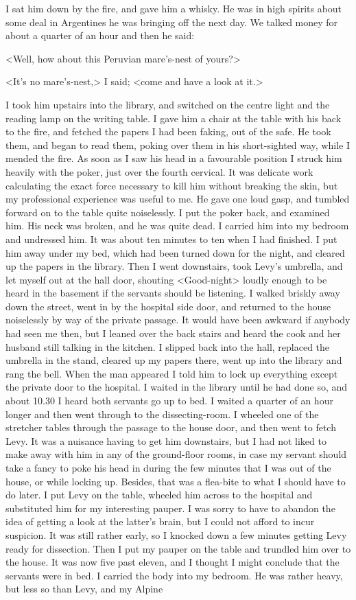 I sat him down by the fire, and gave him a whisky. He was in high spirits about some deal in Argentines he was bringing off the next day. We talked money for about a quarter of an hour and then he said:

<Well, how about this Peruvian mare's-nest of yours?>

<It's no mare's-nest,> I said; <come and have a look at it.>

I took him upstairs into the library, and switched on the centre light and the reading lamp on the writing table. I gave him a chair at the table with his back to the fire, and fetched the papers I had been faking, out of the safe. He took them, and began to read them, poking over them in his short-sighted way, while I mended the fire. As soon as I saw his head in a favourable position I struck him heavily with the poker, just over the fourth cervical. It was delicate work calculating the exact force necessary to kill him without breaking the skin, but my professional experience was useful to me. He gave one loud gasp, and tumbled forward on to the table quite noiselessly. I put the poker back, and examined him. His neck was broken, and he was quite dead. I carried him into my bedroom and undressed him. It was about ten minutes to ten when I had finished. I put him away under my bed, which had been turned down for the night, and cleared up the papers in the library. Then I went downstairs, took Levy's umbrella, and let myself out at the hall door, shouting <Good-night> loudly enough to be heard in the basement if the servants should be listening. I walked briskly away down the street, went in by the hospital side door, and returned to the house noiselessly by way of the private passage. It would have been awkward if anybody had seen me then, but I leaned over the back stairs and heard the cook and her husband still talking in the kitchen. I slipped back into the hall, replaced the umbrella in the stand, cleared up my papers there, went up into the library and rang the bell. When the man appeared I told him to lock up everything except the private door to the hospital. I waited in the library until he had done so, and about 10.30 I heard both servants go up to bed. I waited a quarter of an hour longer and then went through to the dissecting-room. I wheeled one of the stretcher tables through the passage to the house door, and then went to fetch Levy. It was a nuisance having to get him downstairs, but I had not liked to make away with him in any of the ground-floor rooms, in case my servant should take a fancy to poke his head in during the few minutes that I was out of the house, or while locking up. Besides, that was a flea-bite to what I should have to do later. I put Levy on the table, wheeled him across to the hospital and substituted him for my interesting pauper. I was sorry to have to abandon the idea of getting a look at the latter's brain, but I could not afford to incur suspicion. It was still rather early, so I knocked down a few minutes getting Levy ready for dissection. Then I put my pauper on the table and trundled him over to the house. It was now five past eleven, and I thought I might conclude that the servants were in bed. I carried the body into my bedroom. He was rather heavy, but less so than Levy, and my Alpine 